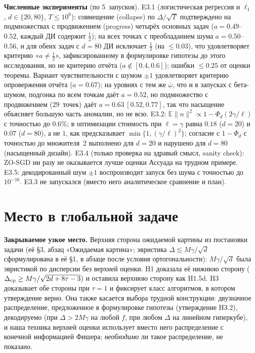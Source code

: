 \documentclass[11pt,a4paper]{article}
\numberwithin{equation}{section}
\theoremstyle{definition}
\theoremstyle{remark}
\newcommand{\E}{\mathbb E}\newcommand{\R}{\mathbb R}\newcommand{\Z}{\mathbb Z}\let\Prob\relax\newcommand{\Prob}{\mathbb P}
\newcommand{\wbar}{\bar\omega}\newcommand{\Atwo}{\cA^{\rm 2pt}_\gamma}
\begin{document}
\begin{tcolorbox}[card,title={H3 на одной странице}]
\textbf{Численные эксперименты} (по 5~запусков). E3.1 (логистическая регрессия и $\ell_1$, $d\in\{20,80\}$, $T\le10^6$): совмещение (collapse) по $\Delta/\sqrt T$ подтверждено на подмножествах с продвижением (progress) четырёх основных задач ($a=0.49$--$0.52$, каждый ДИ содержит $\frac12$); на всех точках с преобладанием шума $a=0.50$--$0.56$, и для обеих задач с $d=80$ ДИ исключает $\frac12$ (на $\le0.03$), что удовлетворяет критерию «$a\ne\frac12$», зафиксированному в формулировке гипотезы до этого исследования, но не критерию отчёта ($a\notin[0.4,0.6]$); ошибки $\le0.25$ от оценки теоремы. Вариант чувствительности с шумом $\pm1$ удовлетворяет критерию опровержения отчёта ($a=0.67$); на уровнях с тем же $\wbar$, что и в запусках с бета-шумом, подгонка по всем точкам даёт $a=0.52$, но подмножество с продвижением ($29$~точек) даёт $a=0.63\ [0.52,0.77]$, так что насыщение объясняет большую часть аномалии, но не всю. E3.2: $\E\|n\|^2\propto1-\Phi_d(2\gamma/\ell)$ с точностью до $0.6\%$; в оптимизации стоимость при $\ell=\gamma$ равна $0.18$ ($d=20$) и $0.07$ ($d=80$), а не $1$, как предсказывает $\min\{1,(\gamma/\ell)^2\}$; согласие с $1-\Phi_d$ с точностью до множителя~2 выполнено для $d=20$ и нарушено для $d=80$ (насыщенный дизайн). E3.4 (только проверка на здравый смысл, sanity check): ZO-SGD ни разу не оказывается лучше оценки Ассуада на трудном примере. E3.5: декодированный шум $\pm1$ воспроизводит запуск без шума с точностью до $10^{-16}$. E3.3 не запускался (вместо него аналитическое сравнение и план).

\end{tcolorbox}

\section{Место в глобальной задаче}\label{sec:place}
\textbf{Закрываемое узкое место.} Верхняя сторона ожидаемой картины из постановки задачи (её \S3, абзац «Ожидаемая картина»; эвристика $\Delta\lesssim M\gamma/\sqrt d$ сформулирована в её \S1, в абзаце после условия ортогональности): $M\gamma/\sqrt d$ была эвристикой по дисперсии без верхней оценки. H1 доказала её нижнюю сторону ($\Delta_{\rm cp}\ge M\gamma/\sqrt{2d+8\tau-3}$) и оставила верхнюю сторону как H1.5d. H3 доказывает обе стороны при $\tau=1$ и фиксирует класс алгоритмов, в котором утверждение верно. Она также касается выбора трудной конструкции: двузначное распределение, предложенное в формулировке гипотезы (утверждение H3.2), декодируемо (при $\Delta>2M\gamma$ на любой $f$, при любом $\Delta$ на линейном гиперкубе), и наша техника верхней оценки использует вместо него распределение с конечной информацией Фишера; \emph{необходимо} ли такое распределение, не показано.
\end{document}
